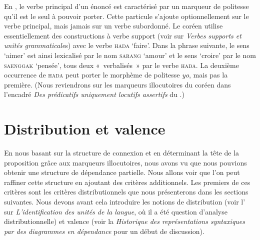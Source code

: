{   En , le verbe principal d’un énoncé est caractérisé par un marqueur de politesse qu’il est le seul à pouvoir porter. Cette particule s’ajoute optionnellement sur le verbe principal, mais jamais sur un verbe subordonné. Le coréen utilise essentiellement des constructions à verbe support (voir  sur \textit{Verbes supports et unités grammaticale}s) avec le verbe \textsc{hada} ‘faire’. Dans la phrase suivante, le sens ‘aimer’ est ainsi lexicalisé par le nom \textsc{sarang} ‘amour’ et le sens ‘croire’ par le nom \textsc{saenggak} ‘pensée’, tous deux «~verbalisés~» par le verbe \textsc{hada}. La deuxième occurrence de \textsc{hada} peut porter le morphème de politesse \textit{yo}, mais pas la première. (Nous reviendrons sur les marqueurs illocutoires du coréen dans l’encadré \textit{Des prédicatifs uniquement locutifs assertifs} du .)

    \ea \let\eachwordone\cjkfont
    \z
    \z
}
\section{Distribution et valence}\label{sec:3.3.10}

En nous basant sur la structure de connexion et en déterminant la tête de la proposition grâce aux marqueurs illocutoires, nous avons vu que nous pouvions obtenir une structure de dépendance partielle. Nous allons voir que l’on peut raffiner cette structure en ajoutant des critères additionnels. Les premiers de ces critères sont les critères distributionnels que nous présenterons dans les sections suivantes. Nous devons avant cela introduire les notions de distribution (voir l' sur \textit{L’identification des unités de la langue}, où il a été question d’analyse distributionnelle) et valence (voir la  \textit{Historique des représentations syntaxiques par des diagrammes en dépendance} pour un début de discussion).

